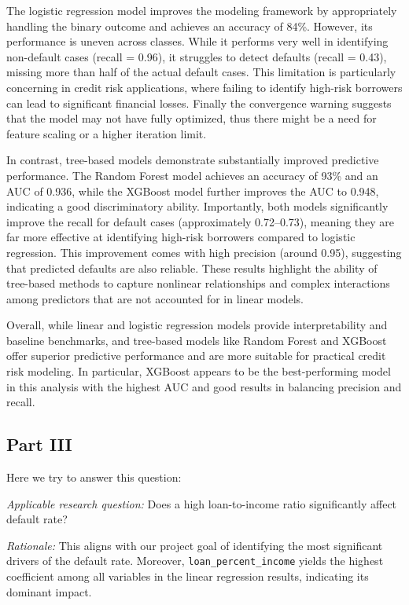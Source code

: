\documentclass[letterpaper]{article}
\begin{document}
The logistic regression model improves the modeling framework by appropriately handling the binary outcome and achieves an accuracy of 84\%. However, its performance is uneven across classes. While it performs very well in identifying non-default cases (recall = 0.96), it struggles to detect defaults (recall = 0.43), missing more than half of the actual default cases. This limitation is particularly concerning in credit risk applications, where failing to identify high-risk borrowers can lead to significant financial losses. Finally the convergence warning suggests that the model may not have fully optimized, thus there might be a need for feature scaling or a higher iteration limit.

In contrast, tree-based models demonstrate substantially improved predictive performance. The Random Forest model achieves an accuracy of 93\% and an AUC of 0.936, while the XGBoost model further improves the AUC to 0.948, indicating a good discriminatory ability. Importantly, both models significantly improve the recall for default cases (approximately 0.72–0.73), meaning they are far more effective at identifying high-risk borrowers compared to logistic regression. This improvement comes with high precision (around 0.95), suggesting that predicted defaults are also reliable. These results highlight the ability of tree-based methods to capture nonlinear relationships and complex interactions among predictors that are not accounted for in linear models.

Overall, while linear and logistic regression models provide interpretability and baseline benchmarks, and tree-based models like Random Forest and XGBoost offer superior predictive performance and are more suitable for practical credit risk modeling. In particular, XGBoost appears to be the best-performing model in this analysis with the highest AUC and good results in balancing precision and recall.
		
		\clearpage
		\subsection{Part III}
		
		Here we try to answer this question:
		
		\emph{Applicable research question:} Does a high loan-to-income ratio significantly affect default rate?
		
		\emph{Rationale:} This aligns with our project goal of identifying the most significant drivers of the default rate. Moreover, \texttt{loan\_percent\_income} yields the highest coefficient among all variables in the linear regression results, indicating its dominant impact.
		
\end{document}
